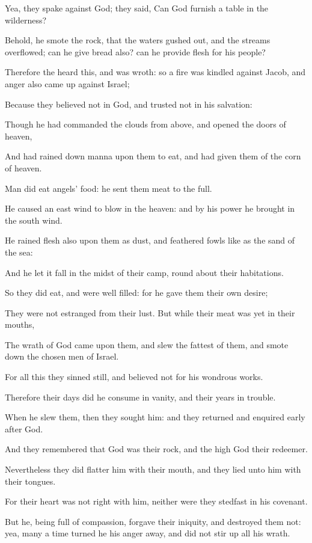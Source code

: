\Verse Yea, they spake against God; they said, Can God furnish a table in the wilderness?

\Verse Behold, he smote the rock, that the waters gushed out, and the streams overflowed; can he give bread also? can he provide flesh for his people?

\Verse Therefore the \LORD heard this, and was wroth: so a fire was kindled against Jacob, and anger also came up against Israel;

\Verse Because they believed not in God, and trusted not in his salvation:

\Verse Though he had commanded the clouds from above, and opened the doors of heaven,

\Verse And had rained down manna upon them to eat, and had given them of the corn of heaven.

\Verse Man did eat angels' food: he sent them meat to the full.

\Verse He caused an east wind to blow in the heaven: and by his power he brought in the south wind.

\Verse He rained flesh also upon them as dust, and feathered fowls like as the sand of the sea:

\Verse And he let it fall in the midst of their camp, round about their habitations.

\Verse So they did eat, and were well filled: for he gave them their own desire;

\Verse They were not estranged from their lust. But while their meat was yet in their mouths,

\Verse The wrath of God came upon them, and slew the fattest of them, and smote down the chosen men of Israel.

\Verse For all this they sinned still, and believed not for his wondrous works.

\Verse Therefore their days did he consume in vanity, and their years in trouble.

\Verse When he slew them, then they sought him: and they returned and enquired early after God.

\Verse And they remembered that God was their rock, and the high God their redeemer.

\Verse Nevertheless they did flatter him with their mouth, and they lied unto him with their tongues.

\Verse For their heart was not right with him, neither were they stedfast in his covenant.

\Verse But he, being full of compassion, forgave their iniquity, and destroyed them not: yea, many a time turned he his anger away, and did not stir up all his wrath.

